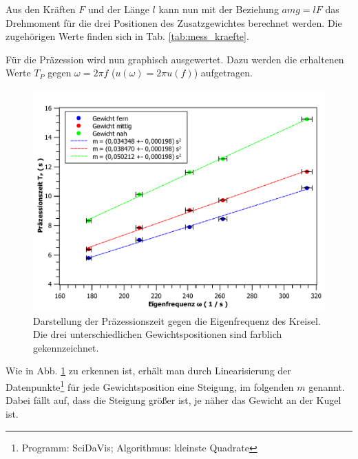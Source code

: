 	Aus den Kräften $F$ und der Länge $l$ kann nun mit der Beziehung $amg = lF$ das Drehmoment für die drei Positionen des Zusatzgewichtes berechnet werden.
	Die zugehörigen Werte finden sich in Tab. \ref{tab:mess_kraefte}.
	
	Für die Präzession wird nun graphisch ausgewertet.
	Dazu werden die erhaltenen Werte $T_P$ gegen $\omega = 2\pi f$ ($u(\omega) = 2\pi u(f)$) aufgetragen.
	\begin{figure}[ht]
		\centering
		\includegraphics[width=\textwidth]{kreisel_wT_multi.pdf}
		\caption{Darstellung der Präzessionszeit gegen die Eigenfrequenz des Kreisel. Die drei unterschiedlichen Gewichtspositionen sind farblich gekennzeichnet.}
		\label{abb:Tw-multi}	
	\end{figure}
	Wie in Abb. \ref{abb:Tw-multi} zu erkennen ist, erhält man durch Linearisierung der Datenpunkte\footnote{Programm: SciDaVis; Algorithmus: kleinste Quadrate} für jede Gewichtsposition eine Steigung, im folgenden $m$ genannt.
	Dabei fällt auf, dass die Steigung größer ist, je näher das Gewicht an der Kugel ist.
	
